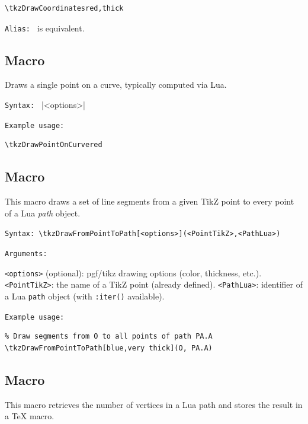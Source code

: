 \begin{mybox}
\begin{verbatim}
\tkzDrawCoordinatesred,thick
\end{verbatim}
\end{mybox}

\texttt{Alias: }  is equivalent.

\subsection{Macro }

Draws a single point on a curve, typically computed via Lua.

\texttt{Syntax: } |\tkzDrawPointOnCurve<options>|

\medskip
\texttt{Example usage: }

\begin{mybox}
\begin{verbatim}
\tkzDrawPointOnCurvered
\end{verbatim}
\end{mybox}

\subsection{Macro }
This macro draws a set of line segments from a given TikZ point to every point of a Lua \emph{path} object.

\texttt{Syntax: }\verb|\tkzDrawFromPointToPath[<options>](<PointTikZ>,<PathLua>)|


\texttt{Arguments: }

\verb|<options>| (optional): pgf/tikz drawing options (color, thickness, etc.).
\verb|<PointTikZ>|: the name of a TikZ point (already defined).
\verb|<PathLua>|: identifier of a Lua \verb|path| object (with \verb|:iter()| available).


\texttt{Example usage: }

\begin{mybox}
\begin{verbatim}
% Draw segments from O to all points of path PA.A
\tkzDrawFromPointToPath[blue,very thick](O, PA.A)
\end{verbatim}
\end{mybox}
\subsection{Macro }
This macro retrieves the number of vertices in a Lua path and stores the result in a TeX macro.


